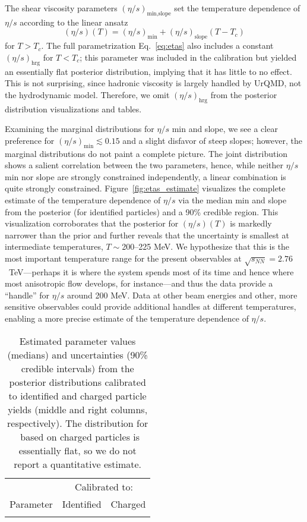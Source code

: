 \documentclass[aps,prc,reprint,amsmath,nofootinbib]{revtex4-1}
\newcommand{\sqrts}{\sqrt{s_{NN}}}
\newcommand{\paddedhline}{\noalign{\smallskip}\hline\noalign{\smallskip}}
\begin{document}
The shear viscosity parameters $(\eta/s)_\text{min,slope}$ set the temperature dependence of $\eta/s$ according to the linear ansatz
\begin{equation}
  (\eta/s)(T) = (\eta/s)_\text{min} + (\eta/s)_\text{slope} (T - T_c)
  \label{eq:etas2}
\end{equation}
for $T > T_c$.
The full parametrization Eq.~\eqref{eq:etas} also includes a constant $(\eta/s)_\text{hrg}$ for $T < T_c$; this parameter was included in the calibration but yielded an essentially flat posterior distribution, implying that it has little to no effect.
This is not surprising, since hadronic viscosity is largely handled by UrQMD, not the hydrodynamic model.
Therefore, we omit $(\eta/s)_\text{hrg}$ from the posterior distribution visualizations and tables.

Examining the marginal distributions for $\eta/s$ min and slope, we see a clear preference for $(\eta/s)_\text{min} \lesssim 0.15$ and a slight disfavor of steep slopes;
however, the marginal distributions do not paint a complete picture.
The joint distribution shows a salient correlation between the two parameters, hence, while neither $\eta/s$ min nor slope are strongly constrained independently, a linear combination is quite strongly constrained.
Figure~\ref{fig:etas_estimate} visualizes the complete estimate of the temperature dependence of $\eta/s$ via the median min and slope from the posterior (for identified particles) and a 90\% credible region.
This visualization corroborates that the posterior for $(\eta/s)(T)$ is markedly narrower than the prior and further reveals that the uncertainty is smallest at intermediate temperatures, $T \sim {}$200--225 MeV.
We hypothesize that this is the most important temperature range for the present observables at $\sqrts = 2.76$~TeV---perhaps it is where the system spends most of its time and hence where most anisotropic flow develops, for instance---and thus the data provide a ``handle'' for $\eta/s$ around 200 MeV.
Data at other beam energies and other, more sensitive observables could provide additional handles at different temperatures, enabling a more precise estimate of the temperature dependence of $\eta/s$.

\begin{table}[b]
  \caption{
    \label{tab:posterior}
    Estimated parameter values (medians) and uncertainties (90\% credible intervals) from the posterior distributions calibrated to identified and charged particle yields (middle and right columns, respectively).
    The distribution for \Tsw\ based on charged particles is essentially flat, so we do not report a quantitative estimate.
  }
  \begin{ruledtabular}
    \begin{tabular}{lll}
      & \multicolumn{2}{c}{Calibrated to:} \\
      \noalign{\smallskip}\cline{2-3}\noalign{\smallskip}
      Parameter & \multicolumn{1}{c}{Identified} & \multicolumn{1}{c}{Charged} \\
      \paddedhline
      
    \end{tabular}
  \end{ruledtabular}
\end{table}
\end{document}
